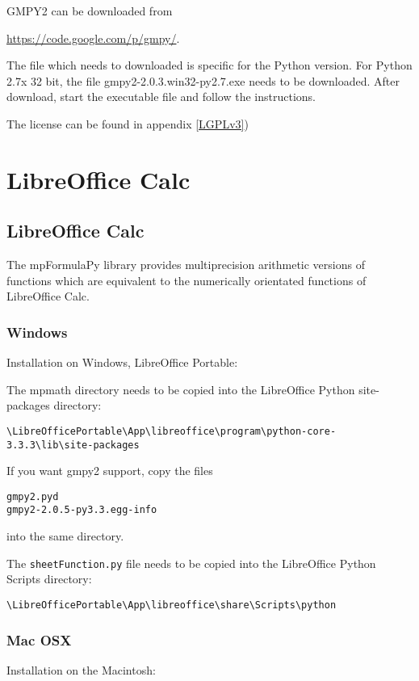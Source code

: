 GMPY2 can be downloaded from

\vpara
\href{https://code.google.com/p/gmpy/}{https://code.google.com/p/gmpy/}.

The file which needs to downloaded is specific for the Python version. For Python 2.7x 32 bit, the file gmpy2-2.0.3.win32-py2.7.exe needs to be downloaded. After download, start the executable file and follow the instructions.

\vpara
The license can be found in appendix \ref{LGPLv3})







\chapter{LibreOffice Calc}
\label{Spreadsheets} 


\section{LibreOffice Calc}
The mpFormulaPy library provides multiprecision arithmetic versions of  functions which are equivalent to the numerically orientated functions of LibreOffice Calc.


\subsection{Windows}
Installation on Windows, LibreOffice Portable:

The mpmath directory needs to be copied into the LibreOffice Python site-packages directory:
\begin{verbatim}
\LibreOfficePortable\App\libreoffice\program\python-core-3.3.3\lib\site-packages
\end{verbatim}
If you want gmpy2 support, copy the files 
\begin{verbatim}
gmpy2.pyd
gmpy2-2.0.5-py3.3.egg-info
\end{verbatim}
into the same directory.

The \verb|sheetFunction.py| file needs to be copied into the  LibreOffice Python Scripts directory:
\begin{verbatim}
\LibreOfficePortable\App\libreoffice\share\Scripts\python
\end{verbatim}


\subsection{Mac OSX}
Installation on the Macintosh:

